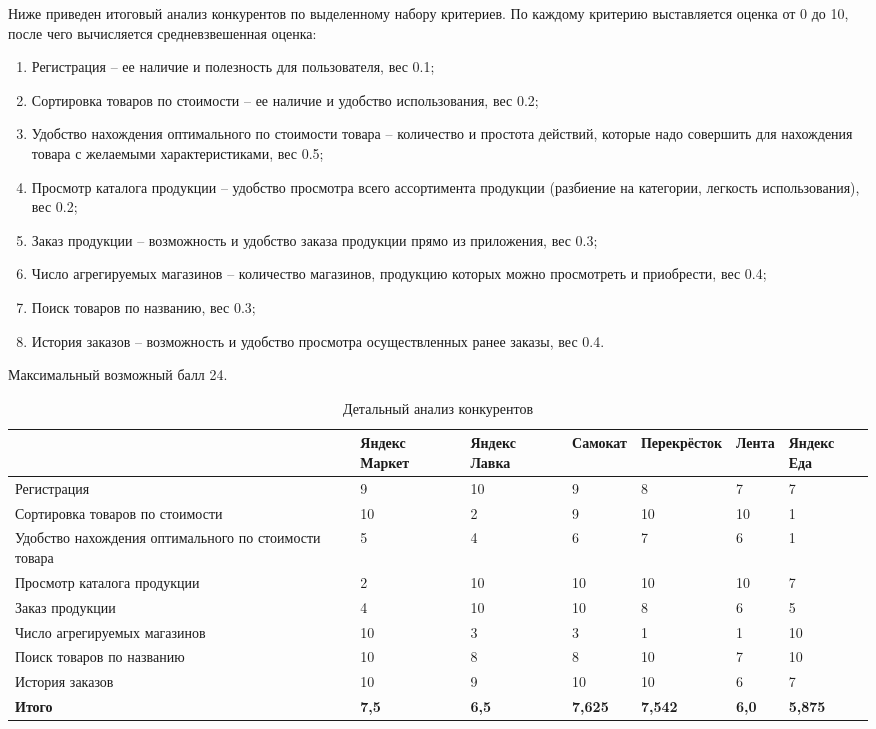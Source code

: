 \documentclass[a4paper,12pt,reqno]{article}
\begin{document}
  Ниже приведен итоговый анализ конкурентов по выделенному набору критериев.
  По каждому критерию выставляется оценка от 0 до 10, после чего вычисляется средневзвешенная оценка:
  \begin{enumerate}
    \item Регистрация -- ее наличие и полезность для пользователя, вес 0.1;
    \item Сортировка товаров по стоимости -- ее наличие и удобство использования, вес 0.2;
    \item Удобство нахождения оптимального по стоимости товара -- количество и простота действий, которые надо совершить для нахождения товара с желаемыми характеристиками, вес 0.5;
    \item Просмотр каталога продукции -- удобство просмотра всего ассортимента продукции (разбиение на категории, легкость использования), вес 0.2;
    \item Заказ продукции -- возможность и удобство заказа продукции прямо из приложения, вес 0.3;
    \item Число агрегируемых магазинов -- количество магазинов, продукцию которых можно просмотреть и приобрести, вес 0.4;
    \item Поиск товаров по названию, вес 0.3;
    \item История заказов -- возможность и удобство просмотра осуществленных ранее заказы, вес 0.4.
  \end{enumerate}
  Максимальный возможный балл 24.

  \begin{table}[h!]
    \caption{Детальный анализ конкурентов}
    \begin{tabularx}{\textwidth}{|p{4cm}|X|X|X|X|X|X|}
      \hline
      & Яндекс Маркет & Яндекс Лавка & Самокат & Пе\-ре\-крёс\-ток & Лента & Яндекс Еда \\\hline
      Регистрация & 9 & 10 & 9 & 8 & 7 & 7 \\\hline
      Сортировка товаров по стоимости & 10 & 2 & 9 & 10 & 10 & 1 \\\hline
      Удобство нахождения оптимального по стоимости товара & 5 & 4 & 6 & 7 & 6 & 1 \\\hline
      Просмотр каталога продукции & 2 & 10 & 10 & 10 & 10 & 7 \\\hline
      Заказ продукции & 4 & 10 & 10 & 8 & 6 & 5 \\\hline
      Число агрегируемых магазинов & 10 & 3 & 3 & 1 & 1 & 10 \\\hline
      Поиск товаров по названию & 10 & 8 & 8 & 10 & 7 & 10 \\\hline
      История заказов & 10 & 9 & 10 & 10 & 6 & 7 \\\hline
      \textbf{Итого} & \textbf{7,5} & \textbf{6,5} & \textbf{7,625} & \textbf{7,542} & \textbf{6,0} & \textbf{5,875} \\\hline
    \end{tabularx}
  \end{table}
\end{document}
